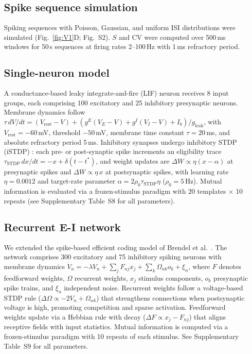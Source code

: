 \subsection{Spike sequence simulation}
\label{sec:theory_cv}
Spiking sequences with Poisson, Gaussian, and uniform ISI distributions were simulated (Fig.~\ref{fig:V1}D; Fig.~S2).  $S$ and CV were computed over 500\,ms windows for 50\,s sequences at firing rates 2--100\,Hz with 1\,ms refractory period.

\subsection{Single-neuron model}
A conductance-based leaky integrate-and-fire (LIF) neuron receives 8 input groups, each comprising 100 excitatory and 25 inhibitory presynaptic neurons.  Membrane dynamics follow $\tau\,dV/dt = (V_{\mathrm{rest}}-V) + (g^E(V_E-V)+g^I(V_I-V)+I_b)/g_{\mathrm{leak}}$, with $V_{\mathrm{rest}}=-60$\,mV, threshold $-50$\,mV, membrane time constant $\tau=20$\,ms, and absolute refractory period 5\,ms.  Inhibitory synapses undergo inhibitory STDP (iSTDP) \cite{17,18}: each pre- or post-synaptic spike increments an eligibility trace $\tau_{\mathrm{STDP}}\,dx/dt = -x + \delta(t-t^*)$, and weight updates are $\Delta W \propto \eta(x-\alpha)$ at presynaptic spikes and $\Delta W \propto \eta\,x$ at postsynaptic spikes, with learning rate $\eta=0.0012$ and target-rate parameter $\alpha=2\rho_0\tau_{\mathrm{STDP}}\eta$ ($\rho_0=5$\,Hz).  Mutual information is evaluated via a frozen-stimulus paradigm with 20 templates $\times$ 10 repeats (see Supplementary Table~S8 for all parameters).

\subsection{Recurrent E-I network}
We extended the spike-based efficient coding model of Brendel et al.\ \cite{brendel_learning_2020}.  The network comprises 300 excitatory and 75 inhibitory spiking neurons with membrane dynamics $\dot{V}_n = -\lambda V_n + \sum_j F_{nj}x_j + \sum_k \Omega_{nk}o_k + \xi_n$, where $F$ denotes feedforward weights, $\Omega$ recurrent weights, $x_j$ stimulus components, $o_k$ presynaptic spike trains, and $\xi_n$ independent noise.  Recurrent weights follow a voltage-based STDP rule ($\Delta\Omega \propto -2V_n + \Omega_{nk}$) that strengthens connections when postsynaptic voltage is high, promoting competition and sparse activation.  Feedforward weights update via a Hebbian rule with decay ($\Delta F \propto x_j - F_{nj}$) that aligns receptive fields with input statistics.  Mutual information is computed via a frozen-stimulus paradigm with 10 repeats of each stimulus.  See Supplementary Table~S9 for all parameters.

